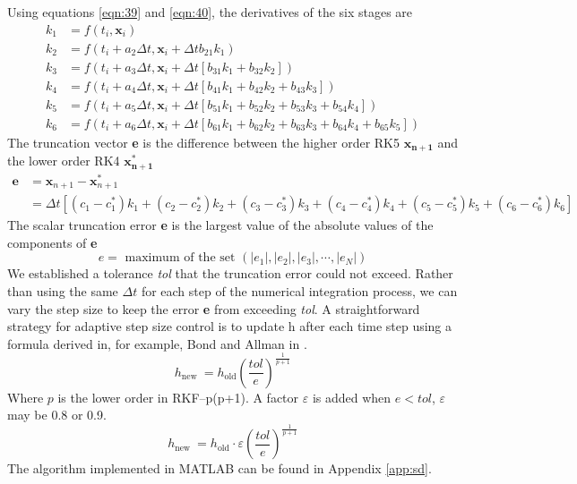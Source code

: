 Using equations \ref{eqn:39} and \ref{eqn:40}, the derivatives of the six stages are
\begin{equation}
\begin{aligned}
k_{1} &=f\left(t_{i}, \mathbf{x}_{i}\right) \\
k_{2} &=f\left(t_{i}+a_{2} \Delta t, \mathbf{x}_{i}+\Delta t b_{21} k_{1}\right) \\
k_{3} &=f\left(t_{i}+a_{3} \Delta t, \mathbf{x}_{i}+\Delta t\left[b_{31} k_{1}+b_{32} k_{2}\right]\right) \\
k_{4} &=f\left(t_{i}+a_{4} \Delta t, \mathbf{x}_{i}+\Delta t\left[b_{41} k_{1}+b_{42} k_{2}+b_{43} k_{3}\right]\right) \\
k_{5} &=f\left(t_{i}+a_{5} \Delta t, \mathbf{x}_{i}+\Delta t\left[b_{51} k_{1}+b_{52} k_{2}+b_{53} k_{3}+b_{54} k_{4}\right]\right) \\
k_{6} &=f\left(t_{i}+a_{6} \Delta t, \mathbf{x}_{i}+\Delta t\left[b_{61} k_{1}+b_{62} k_{2}+b_{63} k_{3}+b_{64} k_{4}+b_{65} k_{5}\right]\right)
\end{aligned}
\end{equation}
The truncation vector \textbf{e} is the difference between the higher order RK5 $\mathbf{x_{n+1}}$ and the lower order RK4 $\mathbf{x^{*}_{n+1}}$
\begin{equation}
\begin{aligned}
\mathbf{e} &=\mathbf{x}_{n+1}-\mathbf{x}_{n+1}^{*} \\
&=\Delta t \left[\left(c_{1}-c_{1}^{*}\right) k_{1}+\left(c_{2}-c_{2}^{*}\right) k_{2}+\left(c_{3}-c_{3}^{*}\right) k_{3}+\left(c_{4}-c_{4}^{*}\right) k_{4}+\left(c_{5}-c_{5}^{*}\right) k_{5}+\left(c_{6}-c_{6}^{*}\right) k_{6}\right]
\end{aligned}
\end{equation}
The scalar truncation error \textbf{e} is the largest value of the absolute values of the components of \textbf{e}
\begin{equation}
e=\text { maximum of the set }\left(\left|e_{1}\right|,\left|e_{2}\right|,\left|e_{3}\right|, \cdots,\left|e_{N}\right|\right)
\end{equation}
We established a tolerance \textit{tol} that the truncation error could not exceed. Rather than using the same $\Delta t$ for each step of the numerical integration process, we can vary the step size to keep the error \textbf{e} from exceeding \textit{tol}. A straightforward strategy for adaptive step size control is to update h after each time step using a formula derived in, for example, Bond and Allman in \cite{bond1996modern}.
\begin{equation}
h_{\text {new }}=h_{\mathrm{old}}\left(\frac{t o l}{e}\right)^{\frac{1}{p+1}}
\end{equation}
Where $p$ is the lower order in RKF--p(p+1). A factor $\varepsilon$ is added when $e<tol$, $\varepsilon$ may be 0.8 or 0.9. 
\begin{equation}
h_{\text {new }}=h_{\mathrm{old}}\cdot \varepsilon\left(\frac{t o l}{e}\right)^{\frac{1}{p+1}}
\end{equation}
The algorithm implemented in MATLAB can be found in Appendix \ref{app:sd}.

